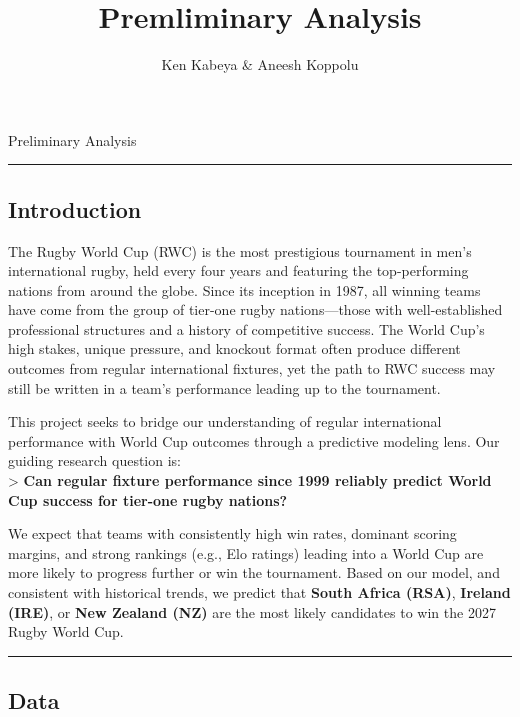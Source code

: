 \documentclass[
  letterpaper,
  DIV=11,
  numbers=noendperiod]{scrartcl}
\title{Premliminary Analysis}
\author{Ken Kabeya \& Aneesh Koppolu}
\date{}
\renewcommand*\contentsname{Table of contents}
\newcommand\contentsname{Table of contents}
\begin{document}
\maketitle

\renewcommand*\contentsname{Table of contents}
{
\hypersetup{linkcolor=}
\setcounter{tocdepth}{3}
\tableofcontents
}

Preliminary Analysis

\begin{center}\rule{0.5\linewidth}{0.5pt}\end{center}

\subsection{\texorpdfstring{\textbf{Introduction}}{Introduction}}\label{introduction}

The Rugby World Cup (RWC) is the most prestigious tournament in men's
international rugby, held every four years and featuring the
top-performing nations from around the globe. Since its inception in
1987, all winning teams have come from the group of tier-one rugby
nations---those with well-established professional structures and a
history of competitive success. The World Cup's high stakes, unique
pressure, and knockout format often produce different outcomes from
regular international fixtures, yet the path to RWC success may still be
written in a team's performance leading up to the tournament.

This project seeks to bridge our understanding of regular international
performance with World Cup outcomes through a predictive modeling lens.
Our guiding research question is:\\
\textgreater{} \textbf{Can regular fixture performance since 1999
reliably predict World Cup success for tier-one rugby nations?}

We expect that teams with consistently high win rates, dominant scoring
margins, and strong rankings (e.g., Elo ratings) leading into a World
Cup are more likely to progress further or win the tournament. Based on
our model, and consistent with historical trends, we predict that
\textbf{South Africa (RSA)}, \textbf{Ireland (IRE)}, or \textbf{New
Zealand (NZ)} are the most likely candidates to win the 2027 Rugby World
Cup.

\begin{center}\rule{0.5\linewidth}{0.5pt}\end{center}

\subsection{\texorpdfstring{\textbf{Data}}{Data}}\label{data}
\end{document}
